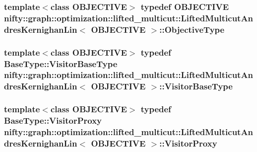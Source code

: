 \subsubsection[{Objective\+Type}]{\setlength{\rightskip}{0pt plus 5cm}template$<$class O\+B\+J\+E\+C\+T\+I\+V\+E$>$ typedef O\+B\+J\+E\+C\+T\+I\+V\+E {\bf nifty\+::graph\+::optimization\+::lifted\+\_\+multicut\+::\+Lifted\+Multicut\+Andres\+Kernighan\+Lin}$<$ O\+B\+J\+E\+C\+T\+I\+V\+E $>$\+::{\bf Objective\+Type}}\label{classnifty_1_1graph_1_1optimization_1_1lifted__multicut_1_1LiftedMulticutAndresKernighanLin_a658bf9081f6bab3e55d4707d1ca57780}
\hypertarget{classnifty_1_1graph_1_1optimization_1_1lifted__multicut_1_1LiftedMulticutAndresKernighanLin_a36384cde373a8f776b897b4cb83607bb}{}
\subsubsection[{Visitor\+Base\+Type}]{\setlength{\rightskip}{0pt plus 5cm}template$<$class O\+B\+J\+E\+C\+T\+I\+V\+E$>$ typedef {\bf Base\+Type\+::\+Visitor\+Base\+Type} {\bf nifty\+::graph\+::optimization\+::lifted\+\_\+multicut\+::\+Lifted\+Multicut\+Andres\+Kernighan\+Lin}$<$ O\+B\+J\+E\+C\+T\+I\+V\+E $>$\+::{\bf Visitor\+Base\+Type}}\label{classnifty_1_1graph_1_1optimization_1_1lifted__multicut_1_1LiftedMulticutAndresKernighanLin_a36384cde373a8f776b897b4cb83607bb}
\hypertarget{classnifty_1_1graph_1_1optimization_1_1lifted__multicut_1_1LiftedMulticutAndresKernighanLin_a95be4fc2d2b7c812c300c7e42eb35f29}{}
\subsubsection[{Visitor\+Proxy}]{\setlength{\rightskip}{0pt plus 5cm}template$<$class O\+B\+J\+E\+C\+T\+I\+V\+E$>$ typedef Base\+Type\+::\+Visitor\+Proxy {\bf nifty\+::graph\+::optimization\+::lifted\+\_\+multicut\+::\+Lifted\+Multicut\+Andres\+Kernighan\+Lin}$<$ O\+B\+J\+E\+C\+T\+I\+V\+E $>$\+::{\bf Visitor\+Proxy}}\label{classnifty_1_1graph_1_1optimization_1_1lifted__multicut_1_1LiftedMulticutAndresKernighanLin_a95be4fc2d2b7c812c300c7e42eb35f29}


